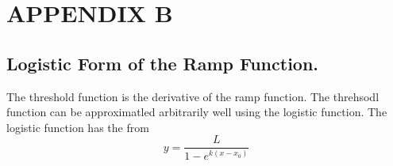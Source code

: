 %
%
%


\chapter{\texorpdfstring{\MakeUppercase{APPENDIX B}}{APPENDIX B}}

\section{Logistic Form of the Ramp Function. }

The threshold function is the derivative of the ramp function. The
threhsodl function can be approximatled arbitrarily well using the
logistic function. The logistic function has the from
\begin{equation}
    y=\frac{L}{1-e^{k\left(x-x_{0}\right)}}
\end{equation}


\pagebreak{}

